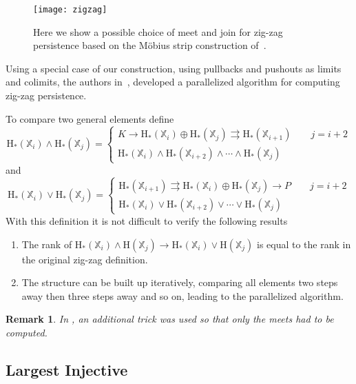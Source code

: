 \documentclass[10pt]{amsart}
\newtheorem{remark}[theorem]{Remark}
\newcommand{\X}{\mathbb{X}}
\newcommand{\Hg}{\mathrm{H}}
\newcommand{\rto}{\rightarrow}
\newcommand{\meet}{\wedge}
\newcommand{\join}{\vee}
\begin{document}
\begin{figure}[ht]
\begin{center}
\texttt{[image: zigzag]}
\caption{\label{fig:zz}  Here we show a possible choice of meet and
  join for  zig-zag persistence based on the M\" obius strip
  construction of~\cite{Car09}.}
\end{center}
\end{figure}

Using a special case of our construction, using pullbacks and pushouts as limits and colimits, the authors in~\cite{Sk12}, developed a parallelized algorithm for computing zig-zag persistence.  

To compare two general elements define
\begin{equation*}
\Hg_*(\X_i)\meet\Hg_*(\X_j) = \begin{cases} K \rto \Hg_*(\X_i)\oplus \Hg_*(\X_j)\rightrightarrows \Hg_*(\X_{i+1}) \qquad  j=i+2\\
\Hg_*(\X_i)\meet\Hg_*(\X_{i+2})\meet\cdots\meet\Hg_*(\X_j) \
\end{cases}
\end{equation*}
and
\begin{equation*}
\Hg_*(\X_i)\join\Hg_*(\X_j) = \begin{cases} \Hg_*(\X_{i+1}) \rightrightarrows  \Hg_*(\X_i)\oplus \Hg_*(\X_j) \rto P \qquad  j=i+2\\
\Hg_*(\X_i)\join\Hg_*(\X_{i+2})\join\cdots\join\Hg_*(\X_j) \
\end{cases}
\end{equation*}
With this definition it is not difficult to verify the following results
\begin{enumerate}
\item The rank of $\Hg_*(\X_i)\meet\Hg(\X_j)  \rightarrow
  \Hg_*(\X_i)\join\Hg(\X_j)$ is equal to the  rank in the original zig-zag
  definition.
\item The structure can be built up iteratively, comparing all
  elements two steps away then three steps away and
  so on, leading to the parallelized algorithm. 
\end{enumerate}
\begin{remark}
In \cite{Sk12}, an additional trick was used so that only the meets had to
be computed. 
\end{remark}




\subsection{Largest Injective}
\end{document}
